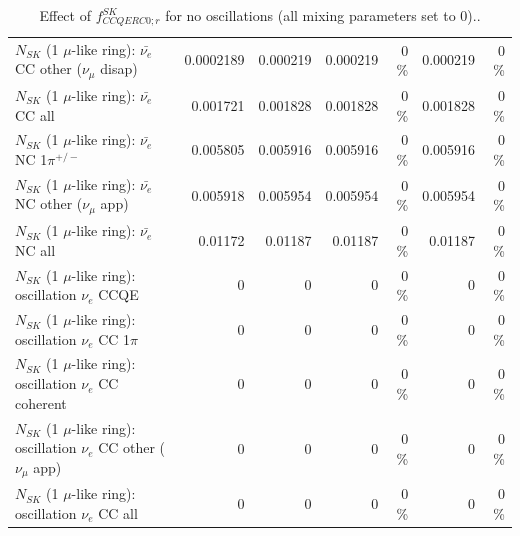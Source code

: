 \begin{table}
\begin{tabular}{| l | r | r | r  r | r  r |}
          $N_{SK}$ (1 $\mu$-like ring): $\bar{\nu_e}$ CC other ($\nu_\mu$ disap) &       0.0002189 &        0.000219 &        0.000219 &        0 \%  &        0.000219 &        0 \%  \\ 
                            $N_{SK}$ (1 $\mu$-like ring): $\bar{\nu_{e}}$ CC all &        0.001721 &        0.001828 &        0.001828 &        0 \%  &        0.001828 &        0 \%  \\ 
\hline
                     $N_{SK}$ (1 $\mu$-like ring): $\bar{\nu_e}$ NC 1$\pi^{+/-}$ &        0.005805 &        0.005916 &        0.005916 &        0 \%  &        0.005916 &        0 \%  \\ 
            $N_{SK}$ (1 $\mu$-like ring): $\bar{\nu_e}$ NC other ($\nu_\mu$ app) &        0.005918 &        0.005954 &        0.005954 &        0 \%  &        0.005954 &        0 \%  \\ 
                            $N_{SK}$ (1 $\mu$-like ring): $\bar{\nu_{e}}$ NC all &         0.01172 &         0.01187 &         0.01187 &        0 \%  &         0.01187 &        0 \%  \\ 
\hline
\hline
\hline
                          $N_{SK}$ (1 $\mu$-like ring): oscillation $\nu_e$ CCQE &               0 &               0 &               0 &        0 \%  &               0 &        0 \%  \\ 
                     $N_{SK}$ (1 $\mu$-like ring): oscillation $\nu_e$ CC 1$\pi$ &               0 &               0 &               0 &        0 \%  &               0 &        0 \%  \\ 
                   $N_{SK}$ (1 $\mu$-like ring): oscillation $\nu_e$ CC coherent &               0 &               0 &               0 &        0 \%  &               0 &        0 \%  \\ 
      $N_{SK}$ (1 $\mu$-like ring): oscillation $\nu_e$ CC other ($\nu_\mu$ app) &               0 &               0 &               0 &        0 \%  &               0 &        0 \%  \\ 
                       $N_{SK}$ (1 $\mu$-like ring): oscillation $\nu_e$  CC all &               0 &               0 &               0 &        0 \%  &               0 &        0 \%  \\ 
\hline
\hline
\end{tabular}
\caption{ Effect of $f_{CCQERC0; r}^{SK}$ for no oscillations (all mixing parameters set to 0).. }
\label{tab:num_sk_1Rmu_ccqe_ring_counting_eff_0_1RmuT_3f_osc_t13:0_spectralreco_spectraltrue}
\end{table}
